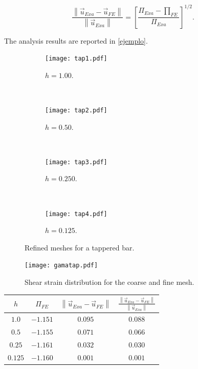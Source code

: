 \[\frac{{\left\| {{{\vec u}_{Exa}} - {{\vec u}_{FE}}} \right\|}}{{\left\| {{{\vec u}_{Exa}}} \right\|}} = {\left[ {\frac{{{\Pi _{Exa}} - {\prod _{FE}}}}{{{\Pi _{Exa}}}}} \right]^{1/2}}.\]

The analysis results are reported in \cref{ejemplo}.



\begin{figure}[H]
\centering
	\begin{subfigure}[b]{0.450\textwidth}\qquad
		\texttt{[image: tap1.pdf]}
		\caption{$h=1.00$. }
	\end{subfigure}\,
%
	\begin{subfigure}[b]{0.450\textwidth}\qquad
		\texttt{[image: tap2.pdf]}
		\caption{$h=0.50$.}
	\end{subfigure}\\
%
\centering
	\begin{subfigure}[b]{0.450\textwidth}\qquad
		\texttt{[image: tap3.pdf]}
		\caption{$h=0.250$.}
	\end{subfigure}\,
%
	\begin{subfigure}[b]{0.450\textwidth}\qquad
		\texttt{[image: tap4.pdf]}
		\caption{$h=0.125$.}
	\end{subfigure}
%
\caption{Refined meshes for a tappered bar.}
\label{mallas}
\end{figure}


\begin{figure}[H]
\centering
\texttt{[image: gamatap.pdf]}
\caption{Shear strain distribution for the coarse and fine mesh.}
\label{gamatap}
\end{figure}




\begin{center}
\begin{tabular}{cccc}
  \hline
  $h$ & ${\Pi _{FE}}$ & $\left\| {{{\vec u}_{Exa}} - {{\vec u}_{FE}}} \right\|$ & $\frac{{\left\| {{{\vec u}_{Exa}} - {{\vec u}_{FE}}} \right\|}}{{\left\| {{{\vec u}_{Exa}}} \right\|}}$ \\
  \hline 
  $1.0$      & $-1.151$ & $0.095$  & $0.088$  \\
   $0.5$     & $-1.155$ & $0.071$  & $0.066$  \\
   $0.25$    & $-1.161$ & $0.032$  & $0.030$  \\
   $ 0.125$  & $-1.160$ & $0.001$  & $0.001$  \\
  \hline
\end{tabular}
\label{ejemplo}
\end{center}

